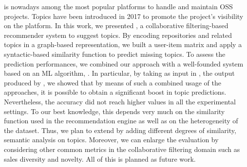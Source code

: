 \GH is nowadays among the most popular platforms to handle and maintain OSS projects. 
Topics have been introduced in 2017 to promote the project's visibility on the 
platform. 
In this work, we presented \TF, a collaborative filtering-based recommender 
system to suggest \GH topics.  By encoding repositories and related topics in a 
graph-based representation, we built a user-item matrix and apply a 
syntactic-based similarity function to predict missing topics.
To assess the prediction performances, we combined our approach with a well-founded system based on an ML algorithm, \ie \MNB. In particular, by taking as input in \TF, the 
output produced by \MNB, we showed that by means of such a combined usage of the approaches, it is possible to obtain a significant boost in topic predictions. 
Nevertheless, the accuracy did not reach higher values in all the experimental 
settings. To our best knowledge, this depends very much on the similarity function used in 
the recommendation engine as well as on the heterogeneity of the dataset. Thus, 
we plan to extend \TF by adding different degrees of similarity, \eg 
semantic analysis on topics. Moreover, we can enlarge the evaluation by 
considering other common metrics in the collaborative filtering domain such as 
sales diversity and novelty. All of this is planned as future work.
